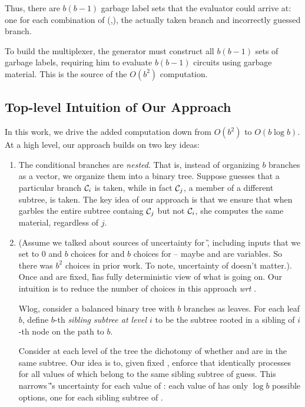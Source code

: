 Thus, there are $b(b-1)$ garbage label sets that the evaluator
could arrive at: one for each combination of (\truth,\guess), the  actually taken branch and
incorrectly guessed branch.
%


To build the multiplexer, the generator must construct all $b(b-1)$
sets of garbage labels, requiring him to evaluate $b(b-1)$ circuits
using garbage material.
This is the source of the $O(b^2)$ computation.


\subsection{Top-level Intuition of Our Approach}

In this work, we drive the added computation down from $O(b^2)$ to
$O(b \log b)$.
At a high level, our approach builds on two key ideas:
\begin{enumerate}
  \item The conditional branches are \emph{nested}.
    That is, instead of organizing $b$ branches as a vector, we
    organize them into a binary tree.
    Suppose \E guesses that a particular branch $\mathcal{C}_i$ is taken,
    while in fact $\mathcal{C}_j$, a member of a different subtree, is taken.
    The key idea of our approach is that we ensure that when \ev
    garbles the entire subtree containg $\mathcal{C}_j$ but not $\mathcal{C}_i$, she
    computes the same material, regardless of $j$.
    
  \item (Assume we talked about sources of uncertainty for \G, including inputs that we set to 0 and $b$ choices for \guess and $b$ choices for \truth -- maybe \guess and \truth are variables. So there was $b^2$ choices in prior work. To note, uncertainty of \E doesn't matter.). Once \guess and \truth are fixed, \G has fully deterministic view of what is going on.  Our intuition is to reduce the number of \truth choices in this approach {\em wrt  \guess}. 
  
  Wlog, consider a balanced binary tree with $b$ branches as leaves. 
  For each leaf $b$, define $b$-th {\em sibling subtree at level $i$} to be the subtree rooted in a sibling of $i$-th node on the path to $b$.
  
  Consider at each level of the tree the dichotomy of whether \guess and \truth are in the same subtree. Our idea is to, given fixed \guess, enforce that \E identically processes \guess for all values of \truth which belong to the same sibling subtree of guess. This narrows \G’s uncertainty for each value of \guess: each value of \guess has only $\log b$ possible \truth options, one for each sibling subtree of \guess.
    

\end{enumerate}
